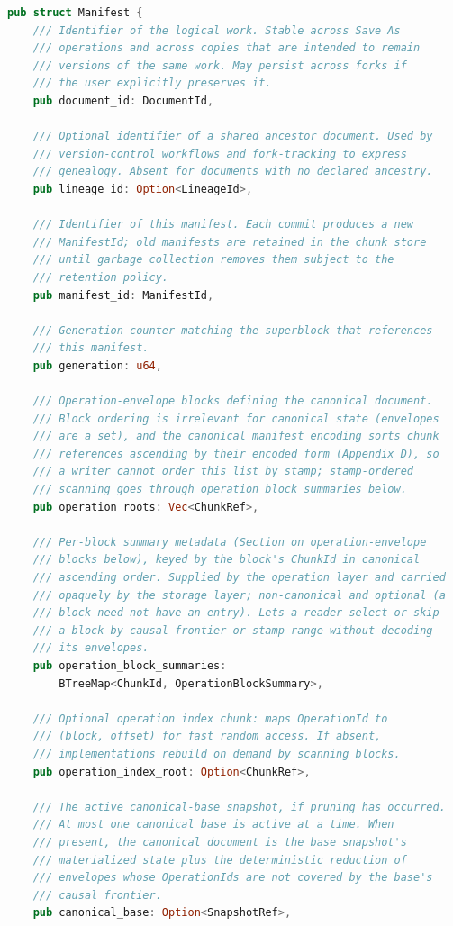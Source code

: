\documentclass[11pt,letterpaper]{report}
\begin{document}
\begin{lstlisting}[language=Rust]
pub struct Manifest {
    /// Identifier of the logical work. Stable across Save As
    /// operations and across copies that are intended to remain
    /// versions of the same work. May persist across forks if
    /// the user explicitly preserves it.
    pub document_id: DocumentId,

    /// Optional identifier of a shared ancestor document. Used by
    /// version-control workflows and fork-tracking to express
    /// genealogy. Absent for documents with no declared ancestry.
    pub lineage_id: Option<LineageId>,

    /// Identifier of this manifest. Each commit produces a new
    /// ManifestId; old manifests are retained in the chunk store
    /// until garbage collection removes them subject to the
    /// retention policy.
    pub manifest_id: ManifestId,

    /// Generation counter matching the superblock that references
    /// this manifest.
    pub generation: u64,

    /// Operation-envelope blocks defining the canonical document.
    /// Block ordering is irrelevant for canonical state (envelopes
    /// are a set), and the canonical manifest encoding sorts chunk
    /// references ascending by their encoded form (Appendix D), so
    /// a writer cannot order this list by stamp; stamp-ordered
    /// scanning goes through operation_block_summaries below.
    pub operation_roots: Vec<ChunkRef>,

    /// Per-block summary metadata (Section on operation-envelope
    /// blocks below), keyed by the block's ChunkId in canonical
    /// ascending order. Supplied by the operation layer and carried
    /// opaquely by the storage layer; non-canonical and optional (a
    /// block need not have an entry). Lets a reader select or skip
    /// a block by causal frontier or stamp range without decoding
    /// its envelopes.
    pub operation_block_summaries:
        BTreeMap<ChunkId, OperationBlockSummary>,

    /// Optional operation index chunk: maps OperationId to
    /// (block, offset) for fast random access. If absent,
    /// implementations rebuild on demand by scanning blocks.
    pub operation_index_root: Option<ChunkRef>,

    /// The active canonical-base snapshot, if pruning has occurred.
    /// At most one canonical base is active at a time. When
    /// present, the canonical document is the base snapshot's
    /// materialized state plus the deterministic reduction of
    /// envelopes whose OperationIds are not covered by the base's
    /// causal frontier.
    pub canonical_base: Option<SnapshotRef>,


\end{lstlisting}
\end{document}
